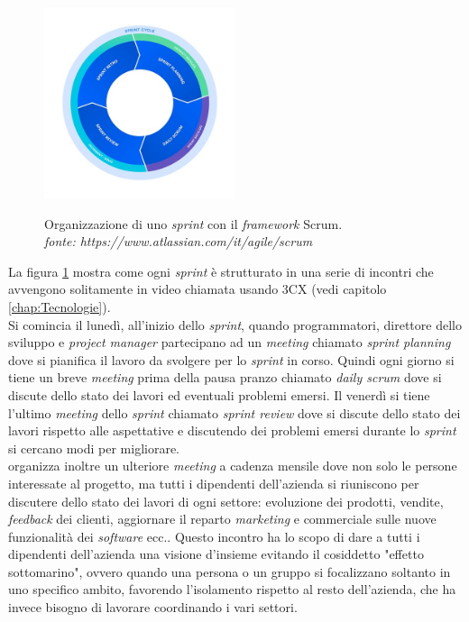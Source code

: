 \begin{figure}[H]
      \centering
      \includegraphics[alt={Organizzazione di uno \textit{sprint} con il \textit{framework} Scrum}, width=0.5\textwidth]{img/scrum.jpg}
      \caption[Organizzazione di uno \textit{sprint} con il \textit{framework} Scrum]
              {Organizzazione di uno \textit{sprint} con il \textit{framework} Scrum. \\ \textit{fonte: https://www.atlassian.com/it/agile/scrum}}
      \label{fig:scrum}
  \end{figure}

La figura \ref{fig:scrum} mostra come ogni \textit{sprint} è strutturato in una serie di incontri che avvengono solitamente in video chiamata usando 
3CX (vedi capitolo \ref{chap:Tecnologie}).\\ 
Si comincia il lunedì, all'inizio dello \textit{sprint}, quando programmatori, direttore dello sviluppo e \textit{project manager} partecipano 
ad un \textit{meeting} chiamato \textit{sprint planning} dove si pianifica il lavoro da svolgere per lo \textit{sprint} in corso.
Quindi ogni giorno si tiene un breve \textit{meeting} prima della pausa pranzo chiamato \textit{daily scrum} dove si discute dello stato dei lavori ed 
eventuali problemi emersi.
Il venerdì si tiene l'ultimo \textit{meeting} dello \textit{sprint} chiamato \textit{sprint review} dove si discute 
dello stato dei lavori rispetto alle aspettative e discutendo dei problemi emersi durante lo \textit{sprint} si cercano modi per migliorare.\\
{\company} organizza inoltre un ulteriore \textit{meeting} a cadenza mensile dove non solo le persone interessate al progetto, ma tutti i dipendenti dell'azienda 
si riuniscono per discutere dello stato dei lavori di ogni settore: evoluzione dei prodotti, vendite, \textit{feedback} dei clienti, aggiornare il reparto \textit{marketing}
 e commerciale sulle nuove funzionalità dei \textit{software} ecc.. Questo incontro ha 
lo scopo di dare a tutti i dipendenti dell'azienda una visione d'insieme evitando il cosiddetto "effetto sottomarino", ovvero quando una persona o un gruppo si focalizzano 
soltanto in uno specifico ambito, favorendo l'isolamento rispetto al resto dell'azienda, che ha invece bisogno di lavorare coordinando i vari settori.